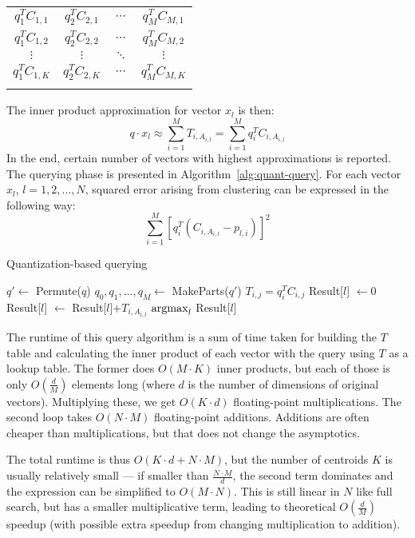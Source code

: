 \renewcommand{\arraystretch}{1.6}
\begin{center}
\begin{tabular}{|c|c|c|c|}
\hhline{----}
$ q_1^T C_{1,1} $ & $ q_2^T C_{2,1} $ & $ \cdots $ & $ q_M^T C_{M,1} $\\
\hhline{----}
$ q_1^T C_{1,2} $ & $ q_2^T C_{2,2} $ & $ \cdots $ & $ q_M^T C_{M,2} $\\
\hhline{----}
$ \vdots $ & $ \vdots $ & $ \ddots $ & $ \vdots $\\
\hhline{----}
$ q_1^T C_{1,K} $ & $ q_2^T C_{2,K} $ & $ \cdots $ & $ q_M^T C_{M,K} $\\
\hhline{----}
\end{tabular}
\end{center}

The inner product approximation for vector $x_l$ is then:
$$q \cdot x_l \approx \sum_{i=1}^{M} T_{i,A_{i,l}} = \sum_{i=1}^{M} q_i^T C_{i,A_{i,l}} $$
In the end, certain number of vectors with highest approximations is reported.
The querying phase is presented in Algorithm~\ref{alg:quant-query}.
For each vector $x_l$, $l = 1,2,...,N$, squared error arising from clustering can be expressed in the following way:
$$ \sum_{i=1}^{M}  [q_{i}^{T} (C_{i, A_{i,l}} - p_{l,i})]^2$$

\begin{algorithm}
	\caption{Quantization-based querying}
	\begin{algorithmic}
		\State $q' \gets$ Permute($q$)
		\State $q_0, q_1, \dots, q_M \gets$ MakeParts($q'$)
				\State $T_{i,j} = q_i^T C_{i,j}$
			\EndFor
		\EndFor
			\State Result[$l$] $\gets 0$
				\State Result[$l$] $\gets$ Result[$l$]$+ T_{i,A_{i,l}}$
			\EndFor
		\EndFor
		\State \Return $\operatorname*{argmax}_{l}$ Result[$l$]
	\end{algorithmic}
\label{alg:quant-query}
\end{algorithm}

The runtime of this query algorithm is a sum of time taken for building the $T$ table and calculating the inner product of each vector with the query using $T$ as a lookup table.
The former does $O(M \cdot K)$ inner products, but each of those is only $O(\frac{d}{M})$
elements long (where $d$ is the number of dimensions of original vectors). 
Multiplying these, we get $O(K \cdot d)$ floating-point multiplications.
The second loop takes $O(N \cdot M)$ floating-point {additions}. Additions are often
cheaper than multiplications, but that does not change the asymptotics.

The total runtime is thus $O(K \cdot d + N \cdot M)$, but the number of centroids $K$ is usually 
relatively small --- if smaller than $\frac{N \cdot M}{d}$, the second term dominates 
and the expression can be simplified to
$O(M \cdot N)$. This is still linear in $N$ like full search, but has a smaller multiplicative
term, leading to theoretical $O(\frac{d}{M})$ speedup (with possible extra speedup from changing
multiplication to addition).

